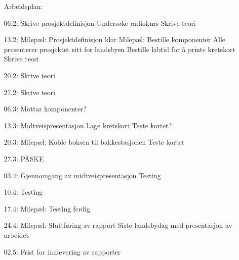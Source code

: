 
Arbeidsplan:

06.2: 	Skrive prosjektdefinisjon
	Undersøke radiokurs
	Skrive teori
	
13.2: 	Milepæl: Prosjektdefinisjon klar 
Milepæl: Bestille komponenter
	Alle presenterer prosjektet sitt for landsbyen
	Bestille labtid for å printe kretskort
	Skrive teori
	
20.2:	Skrive teori

27.2:	Skrive teori

06.3:	Mottar komponenter?

13.3:	Midtveispresentasjon
	Lage kretskort
	Teste kortet?

20.3:   Milepæl: Koble boksen til bakkestasjonen
Teste kortet

27.3: 	PÅSKE

03.4: 	Gjennomgang av midtveispresentasjon
	Testing

10.4:	Testing

17.4: 	Milepæl: Testing ferdig

24.4:	Milepæl: Sluttføring av rapport 
Siste landsbydag med presentasjon av arbeidet

02.5:	Frist for innlevering av rapporter	

